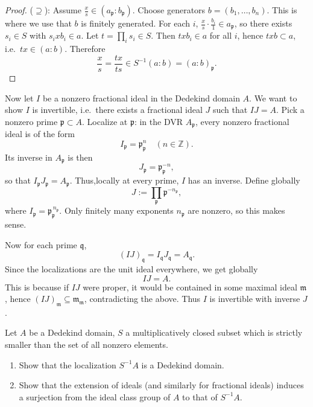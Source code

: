 \documentclass[12pt]{article}  %
\begin{document}
\begin{solution}
\begin{enumerate}[(i)]
\begin{proof}
  ($\supseteq$): Assume $\tfrac{x}{s} \in (a_{\mathfrak{p}} : b_{\mathfrak{p}})$.  
  Choose generators $b = (b_1, \dots, b_n)$. This is where we use that $b$ is finitely generated. For each $i$, $\tfrac{x}{s} \cdot \tfrac{b_i}{1} \in a_{\mathfrak{p}}$, so there exists $s_i \in S$ with $s_i x b_i \in a$. Let $t = \prod_i s_i \in S$. Then $t x b_i \in a$ for all $i$, hence $t x b \subset a$, i.e.\ $t x \in (a : b)$. Therefore
  \[
    \frac{x}{s} = \frac{tx}{ts} \in S^{-1}(a : b) = (a : b)_{\mathfrak{p}}.
  \]
  \end{proof}
\end{enumerate}
Now let $I$ be a nonzero fractional ideal in the Dedekind domain $A$. We want to show $I$ is invertible, i.e.\ there exists a fractional ideal $J$ such that $IJ = A$.
Pick a nonzero prime $\mathfrak{p} \subset A$. Localize at $\mathfrak{p}$: in the DVR $A_{\mathfrak{p}}$, every nonzero fractional ideal is of the form 
  \[
    I_{\mathfrak{p}} = \mathfrak{p}_{\mathfrak{p}}^{n} \quad (n \in \mathbb{Z}).
  \] Its inverse in $A_{\mathfrak{p}}$ is then 
  \[
    J_{\mathfrak{p}} = \mathfrak{p}_{\mathfrak{p}}^{-n},
  \]
  so that $I_{\mathfrak{p}} J_{\mathfrak{p}} = A_{\mathfrak{p}}$. Thus,locally at every prime, $I$ has an inverse.
Define globally
\[
  J := \prod_{\mathfrak{p}} \mathfrak{p}^{-n_{\mathfrak{p}}},
\]
where $I_{\mathfrak{p}} = \mathfrak{p}_{\mathfrak{p}}^{\,n_{\mathfrak{p}}}$.  
Only finitely many exponents $n_{\mathfrak{p}}$ are nonzero, so this makes sense.

Now for each prime $\mathfrak{q}$,
  \[
    (IJ)_{\mathfrak{q}} = I_{\mathfrak{q}} J_{\mathfrak{q}} = A_{\mathfrak{q}}.
  \]
Since the localizations are the unit ideal everywhere, we get globally
  \[
    IJ = A.
  \]
This is because if $IJ$ were proper, it would be contained in some maximal ideal $\mathfrak{m}$, hence $(IJ)_{\mathfrak{m}} \subseteq \mathfrak{m}_{\mathfrak{m}}$, contradicting the above. Thus $I$ is invertible with inverse $J$.
\end{solution}

\begin{problem}{2}
    Let $A$ be a Dedekind domain, $S$ a multiplicatively closed subset which is strictly smaller than the set of all nonzero elements.
\begin{enumerate}
    \item Show that the localization $S^{-1}A$ is a Dedekind domain.
    \item Show that the extension of ideals (and similarly for fractional ideals) induces a surjection from the ideal class group of $A$ to that of $S^{-1}A$.
\end{enumerate}
\end{problem}
\end{document}
